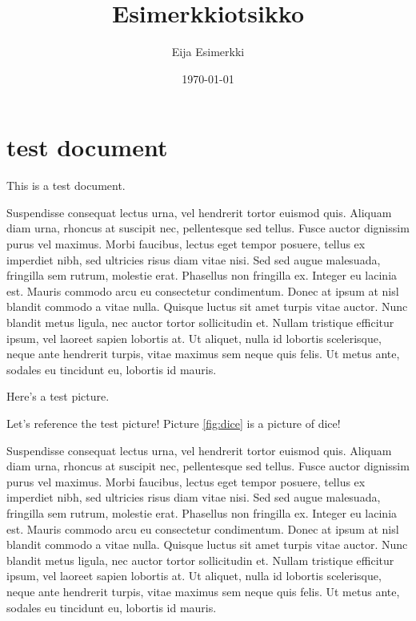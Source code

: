 \documentclass[english]{jamk-report}
\title{Esimerkkiotsikko}
\author{Eija Esimerkki}
\date{\today}
\begin{document}
\frontmatter      %


\maketitle        %
\makeabstract     %
\makeabstractfin

\tableofcontents  %

\mainmatter       %



\section{test document}

This is a test document.

Suspendisse consequat lectus urna, vel hendrerit tortor euismod quis. Aliquam
diam urna, rhoncus at suscipit nec, pellentesque sed tellus. Fusce auctor
dignissim purus vel maximus. Morbi faucibus, lectus eget tempor posuere, tellus
ex imperdiet nibh, sed ultricies risus diam vitae nisi. Sed sed augue
malesuada, fringilla sem rutrum, molestie erat.  Phasellus non fringilla ex.
Integer eu lacinia est. Mauris commodo arcu eu consectetur condimentum. Donec
at ipsum at nisl blandit commodo a vitae nulla.  Quisque luctus sit amet turpis
vitae auctor. Nunc blandit metus ligula, nec auctor tortor sollicitudin et.
Nullam tristique efficitur ipsum, vel laoreet sapien lobortis at. Ut aliquet,
nulla id lobortis scelerisque, neque ante hendrerit turpis, vitae maximus sem
neque quis felis. Ut metus ante, sodales eu tincidunt eu, lobortis id mauris.


Here's a test picture.


Let's reference the test picture! Picture \ref{fig:dice} is a picture of
dice!


Suspendisse consequat lectus urna, vel hendrerit tortor euismod quis. Aliquam
diam urna, rhoncus at suscipit nec, pellentesque sed tellus. Fusce auctor
dignissim purus vel maximus. Morbi faucibus, lectus eget tempor posuere, tellus
ex imperdiet nibh, sed ultricies risus diam vitae nisi. Sed sed augue
malesuada, fringilla sem rutrum, molestie erat.  Phasellus non fringilla ex.
Integer eu lacinia est. Mauris commodo arcu eu consectetur condimentum. Donec
at ipsum at nisl blandit commodo a vitae nulla.  Quisque luctus sit amet turpis
vitae auctor. Nunc blandit metus ligula, nec auctor tortor sollicitudin et.
Nullam tristique efficitur ipsum, vel laoreet sapien lobortis at. Ut aliquet,
nulla id lobortis scelerisque, neque ante hendrerit turpis, vitae maximus sem
neque quis felis. Ut metus ante, sodales eu tincidunt eu, lobortis id mauris.
\end{document}

